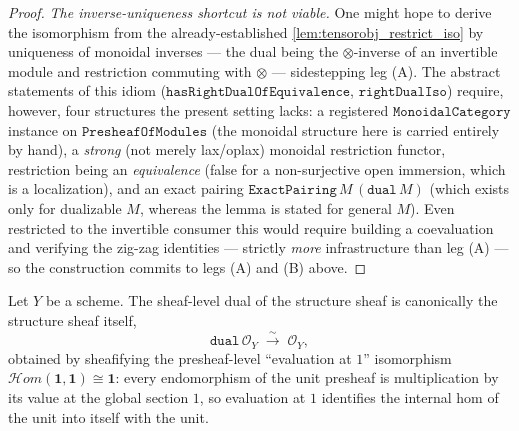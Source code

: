 \begin{proof}
  \emph{The inverse-uniqueness shortcut is not viable.} One might hope to derive the
  isomorphism from the already-established \cref{lem:tensorobj_restrict_iso} by uniqueness of
  monoidal inverses --- the dual being the \(\otimes\)-inverse of an invertible module and
  restriction commuting with \(\otimes\) --- sidestepping leg (A). The abstract statements of
  this idiom (\(\mathtt{hasRightDualOfEquivalence}\), \(\mathtt{rightDualIso}\)) require,
  however, four structures the present setting lacks: a registered \(\mathtt{MonoidalCategory}\)
  instance on \(\mathtt{PresheafOfModules}\) (the monoidal structure here is carried entirely
  by hand), a \emph{strong} (not merely lax/oplax) monoidal restriction functor, restriction
  being an \emph{equivalence} (false for a non-surjective open immersion, which is a
  localization), and an exact pairing \(\mathtt{ExactPairing}\,M\,(\mathtt{dual}\,M)\) (which
  exists only for dualizable \(M\), whereas the lemma is stated for general \(M\)). Even
  restricted to the invertible consumer this would require building a coevaluation and
  verifying the zig-zag identities --- strictly \emph{more} infrastructure than leg (A) --- so
  the construction commits to legs (A) and (B) above.
\end{proof}

\begin{lemma}
  \label{lem:dual_unit_iso}
  Let \(Y\) be a scheme. The sheaf-level dual of the structure sheaf is canonically the
  structure sheaf itself,
  \[
    \mathtt{dual}\,\mathcal{O}_Y \;\xrightarrow{\ \sim\ }\; \mathcal{O}_Y,
  \]
  obtained by sheafifying the presheaf-level ``evaluation at \(1\)'' isomorphism
  \(\mathcal{H}om(\mathbf{1}, \mathbf{1}) \cong \mathbf{1}\): every endomorphism of the
  unit presheaf is multiplication by its value at the global section \(1\), so evaluation
  at \(1\) identifies the internal hom of the unit into itself with the unit.
\end{lemma}

